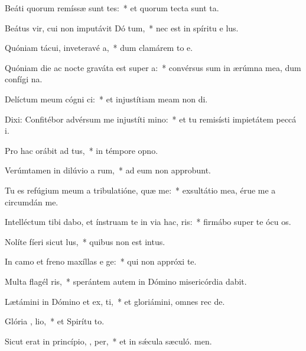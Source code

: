 \item Beáti quorum remíssæ sunt tes:~* et quorum tecta sunt ta.
\item Beátus vir, cui non imputávit Dó tum,~* nec est in spíritu e lus.
\item Quóniam tácui, inveteravé  a,~* dum clamárem to e.
\item Quóniam die ac nocte graváta est super   a:~* convérsus sum in ærúmna mea, dum confígi na.
\item Delíctum meum cógni  ci:~* et injustítiam meam non di.
\item Dixi: Confitébor advérsum me injustíti  mino:~* et tu remisísti impietátem peccá i.
\item Pro hac orábit ad   tus,~* in témpore opno.
\item Verúmtamen in dilúvio a rum,~* ad eum non approbunt.
\item Tu es refúgium meum a tribulatióne, quæ  me:~* exsultátio mea, érue me a circumdán me.
\item Intelléctum tibi dabo, et ínstruam te in via hac,  ris:~* firmábo super te ócu os.
\item Nolíte fíeri sicut   lus,~* quibus non est intus.
\item In camo et freno maxíllas e ge:~* qui non appróxi  te.
\item Multa flagél ris,~* sperántem autem in Dómino misericórdia dabit.
\item Lætámini in Dómino et ex, ti,~* et gloriámini, omnes rec de.
\item Glória ,  lio,~* et Spirítu to.
\item Sicut erat in princípio,  ,  per,~* et in sǽcula sæculó. men.
